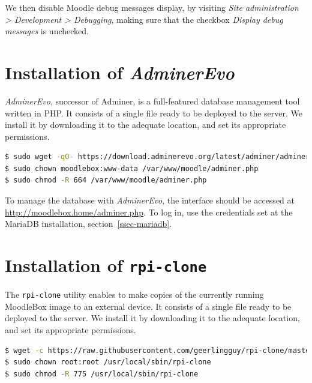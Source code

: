 \documentclass[12pt]{article}
\begin{document}
We then disable Moodle debug messages display, by visiting \emph{Site administration > Development > Debugging}, making sure that the checkbox \emph{Display debug messages} is unchecked.

\section{Installation of \textsl{AdminerEvo}}

\textsl{AdminerEvo}, successor of Adminer, is a full-featured database management tool written in PHP.
It consists of a single file ready to be deployed to the server.
We install it by downloading it to the adequate location, and set its appropriate permissions.
\begin{lstlisting}[language=bash]
$ sudo wget -qO- https://download.adminerevo.org/latest/adminer/adminer.zip | zcat > /var/www/moodle/adminer.php
$ sudo chown moodlebox:www-data /var/www/moodle/adminer.php
$ sudo chmod -R 664 /var/www/moodle/adminer.php
\end{lstlisting}

To manage the database with \textsl{AdminerEvo}, the interface should be accessed at \url{http://moodlebox.home/adminer.php}.
To log in, use the credentials set at the MariaDB installation, section~\ref{ssec-mariadb}.

\section{Installation of \texttt{rpi-clone}}

The \texttt{rpi-clone} utility enables to make copies of the currently running MoodleBox image to an external device.
It consists of a single file ready to be deployed to the server.
We install it by downloading it to the adequate location, and set its appropriate permissions.
\begin{lstlisting}[language=bash]
$ wget -c https://raw.githubusercontent.com/geerlingguy/rpi-clone/master/rpi-clone -O /usr/local/sbin/rpi-clone
$ sudo chown root:root /usr/local/sbin/rpi-clone
$ sudo chmod -R 775 /usr/local/sbin/rpi-clone
\end{lstlisting}
\end{document}
